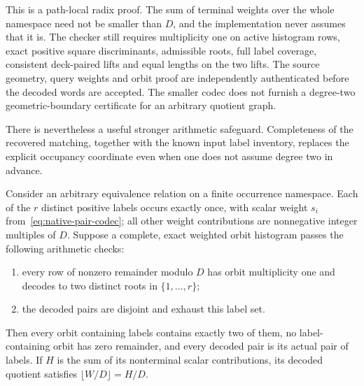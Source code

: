 This is a path-local radix proof.  The sum of terminal weights over the
whole namespace need not be smaller than $D$, and the implementation
never assumes that it is.  The checker still requires multiplicity one
on active histogram rows, exact positive square discriminants, admissible
roots, full label coverage, consistent deck-paired lifts and equal lengths
on the two lifts.  The source geometry, query weights and orbit proof are
independently authenticated before the decoded words are accepted.  The
smaller codec does not furnish a degree-two geometric-boundary certificate
for an arbitrary quotient graph.

There is nevertheless a useful stronger arithmetic safeguard.  Completeness
of the recovered matching, together with the known input label inventory,
replaces the explicit occupancy coordinate even when one does not assume
degree two in advance.

\begin{lemma}
\label{lem:native-pair-global-inventory}
Consider an arbitrary equivalence relation on a finite occurrence namespace.
Each of the $r$ distinct positive labels occurs exactly once, with scalar
weight $s_i$ from~\eqref{eq:native-pair-codec}; all other weight contributions
are nonnegative integer multiples of $D$.  Suppose a complete, exact
weighted orbit histogram passes the following arithmetic checks:
\begin{enumerate}
  \item every row of nonzero remainder modulo $D$ has orbit multiplicity
  one and decodes to two distinct roots in $\{1,\ldots,r\}$;
  \item the decoded pairs are disjoint and exhaust this label set.
\end{enumerate}
Then every orbit containing labels contains exactly two of them, no
label-containing orbit has zero remainder, and every decoded pair is its
actual pair of labels.  If $H$ is the sum of its nonterminal scalar
contributions, its decoded quotient satisfies $\lfloor W/D\rfloor=H/D$.
\end{lemma}

